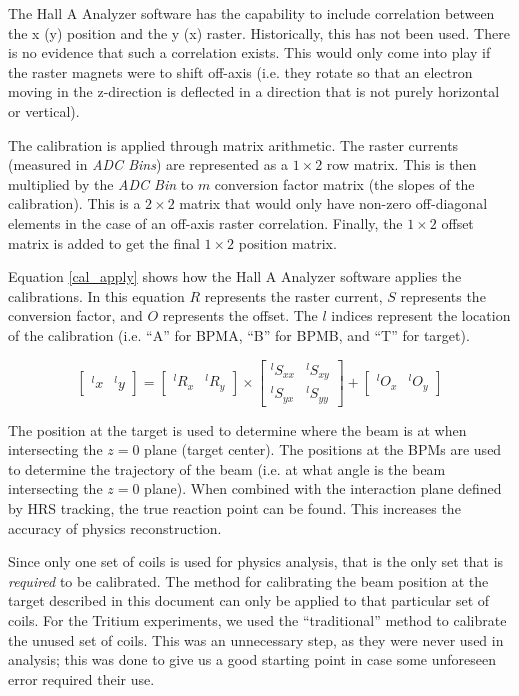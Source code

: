 The Hall A Analyzer software has the capability to include correlation between the x (y) position and the y (x) raster. Historically, this has not been used. There is no evidence that such a correlation exists. This would only come into play if the raster magnets were to shift off-axis (i.e. they rotate so that an electron moving in the z-direction is deflected in a direction that is not purely horizontal or vertical).

The calibration is applied through matrix arithmetic. The raster currents (measured in \textit{ADC Bins}) are represented as a $1\times2$ row matrix. This is then multiplied by the \textit{ADC Bin} to $m$ conversion factor matrix (the slopes of the calibration). This is a $2\times2$ matrix that would only have non-zero off-diagonal elements in the case of an off-axis raster correlation. Finally, the $1\times2$ offset matrix is added to get the final $1\times2$ position matrix.

Equation \ref{cal_apply} shows how the Hall A Analyzer software applies the calibrations. In this equation $R$ represents the raster current, $S$ represents the conversion factor, and $O$ represents the offset. The $l$ indices represent the location of the calibration (i.e. ``A'' for BPMA, ``B'' for BPMB, and ``T'' for target).

\begin{equation}
	\begin{bmatrix}
		^lx & ^ly
	\end{bmatrix}
	=
	\begin{bmatrix}
		^lR_x & ^lR_y
	\end{bmatrix}
	\times
	\begin{bmatrix}
		^lS_{xx} & ^lS_{xy} \\
		^lS_{yx} & ^lS_{yy}
	\end{bmatrix}
	+
	\begin{bmatrix}
		^lO_x & ^lO_y
	\end{bmatrix}
	\label{cal_apply}
\end{equation}

The position at the target is used to determine where the beam is at when intersecting the $z=0$ plane (target center). The positions at the BPMs are used to determine the trajectory of the beam (i.e. at what angle is the beam intersecting the $z=0$ plane). When combined with the interaction plane defined by HRS tracking, the true reaction point can be found. This increases the accuracy of physics reconstruction.

Since only one set of coils is used for physics analysis, that is the only set that is \textit{required} to be calibrated. The method for calibrating the beam position at the target described in this document can only be applied to that particular set of coils. For the Tritium experiments, we used the ``traditional'' method to calibrate the unused set of coils. This was an unnecessary step, as they were never used in analysis; this was done to give us a good starting point in case some unforeseen error required their use.

